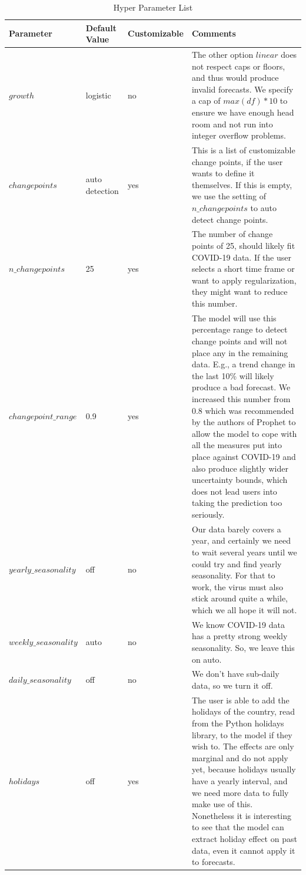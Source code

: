 \begin{table}
  \caption{Hyper Parameter List}
  \centering
  \begin{tabular}{|p{3.5cm}||p{1.6cm}|p{1.6cm}|p{9.6cm}|} %
     \hline
     Parameter & Default Value & Customizable & Comments\\
     \hline
     \hline
     $growth$                    & logistic         & no  & The other option $linear$ does not respect caps or floors, and thus would produce invalid forecasts. We specify a cap of \(max(df) * 10\) to ensure we have enough head room and not run into integer overflow problems. \\
     \hline
     $changepoints$              & auto detection & yes & This is a list of customizable change points, if the user wants to define it themselves. If this is empty, we use the setting of $n\_changepoints$ to auto detect change points. \\
     \hline
     $n\_changepoints$           & 25             & yes & The number of change points of 25, should likely fit COVID-19 data. If the user selects a short time frame or want to apply regularization, they might want to reduce this number. \\
     \hline
     $changepoint\_range$        & 0.9            & yes & The model will use this percentage range to detect change points and will not place any in the remaining data. E.g., a trend change in the last 10\% will likely produce a bad forecast. We increased this number from 0.8 which was recommended by the authors of Prophet to allow the model to cope with all the measures put into place against COVID-19 and also produce slightly wider uncertainty bounds, which does not lead users into taking the prediction too seriously.  \\
     \hline
     $yearly\_seasonality$       & off            & no  & Our data barely covers a year, and certainly we need to wait several years until we could try and find yearly seasonality. For that to work, the virus must also stick around quite a while, which we all hope it will not. \\
     \hline
     $weekly\_seasonality$       & auto           & no  & We know COVID-19 data has a pretty strong weekly seasonality. So, we leave this on auto. \\
     \hline
     $daily\_seasonality$        & off            & no  & We don't have sub-daily data, so we turn it off. \\
     \hline
     $holidays$                  & off            & yes & The user is able to add the holidays of the country, read from the Python holidays library, to the model if they wish to. The effects are only marginal and do not apply yet, because holidays usually have a yearly interval, and we need more data to fully make use of this. Nonetheless it is interesting to see that the model can extract holiday effect on past data, even it cannot apply it to forecasts. \\

\end{tabular}
\end{table}
